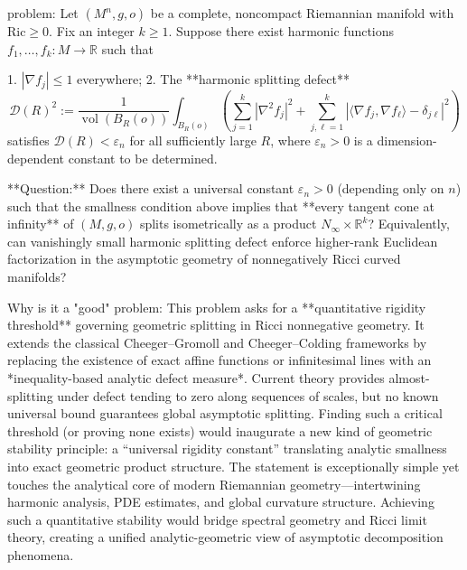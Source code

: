 problem:  
Let \((M^n,g,o)\) be a complete, noncompact Riemannian manifold with \(\mathrm{Ric}\ge0\).  
Fix an integer \(k\ge1\). Suppose there exist harmonic functions \(f_1,\dots,f_k:M\to\mathbb{R}\) such that  

1. \(|\nabla f_j|\le1\) everywhere;  
2. The **harmonic splitting defect**  
   \[
   \mathcal{D}(R)^2 := \frac{1}{\operatorname{vol}(B_R(o))}\int_{B_R(o)}
   \left( 
      \sum_{j=1}^k |\nabla^2 f_j|^2
      +\sum_{j,\ell=1}^k|\langle\nabla f_j,\nabla f_\ell\rangle-\delta_{j\ell}|^2
   \right)
   \]
   satisfies \(\mathcal{D}(R)<\varepsilon_n\) for all sufficiently large \(R\),  
   where \(\varepsilon_n>0\) is a dimension-dependent constant to be determined.  

**Question:**  
Does there exist a universal constant \(\varepsilon_n>0\) (depending only on \(n\)) such that the smallness condition above implies that **every tangent cone at infinity** of \((M,g,o)\) splits isometrically as a product \(N_\infty\times\mathbb{R}^k\)?  
Equivalently, can vanishingly small harmonic splitting defect enforce higher-rank Euclidean factorization in the asymptotic geometry of nonnegatively Ricci curved manifolds?

Why is it a "good" problem:  
This problem asks for a **quantitative rigidity threshold** governing geometric splitting in Ricci nonnegative geometry. It extends the classical Cheeger–Gromoll and Cheeger–Colding frameworks by replacing the existence of exact affine functions or infinitesimal lines with an *inequality-based analytic defect measure*. Current theory provides almost-splitting under defect tending to zero along sequences of scales, but no known universal bound guarantees global asymptotic splitting. Finding such a critical threshold (or proving none exists) would inaugurate a new kind of geometric stability principle: a “universal rigidity constant” translating analytic smallness into exact geometric product structure. The statement is exceptionally simple yet touches the analytical core of modern Riemannian geometry—intertwining harmonic analysis, PDE estimates, and global curvature structure. Achieving such a quantitative stability would bridge spectral geometry and Ricci limit theory, creating a unified analytic-geometric view of asymptotic decomposition phenomena.